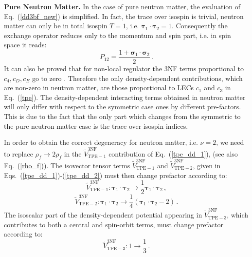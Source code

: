 {\bf Pure Neutron Matter.} In the case of pure neutron matter, the evaluation of Eq.~(\ref{dd3bf_new}) is simplified. In fact,
the trace over isospin is trivial, neutron matter can only be in total isospin $T=1$, i.e. $\boldsymbol\tau_1\cdot\boldsymbol\tau_2=1$. Consequently the exchange operator reduces only to the momentum and spin part, i.e. in spin space it reads:
\begin{equation}
P_{12}=\frac{1+\boldsymbol\sigma_1\cdot\boldsymbol\sigma_2}{2}\,.
\label{perm_op_2}
\end{equation}
It can also be proved that for non-local regulator the 3NF terms proportional to $c_4, c_D, c_E$ go to zero \cite{Tolos2008,Hebeler2010Jul}. Therefore the only density-dependent contributions, which are non-zero in neutron matter, are those proportional to LECs $c_1$ and $c_3$ in Eq.~(\ref{tpe}). The density-dependent interacting terms obtained in neutron matter will only differ with respect to the symmetric case ones by different pre-factors. This is due to the fact that the only part which changes from the symmetric to the pure neutron matter case is the trace over isospin indices. 

In order to obtain the correct degeneracy for neutron matter, i.e.  $\nu=2$, we need to replace $\rho_f \rightarrow 2\rho_f$ in the $\tilde V_\mathrm{TPE-1}^\mathrm{3NF}$ contribution of Eq.~(\ref{tpe_dd_1}), (see also Eq.~(\ref{rho_f})). The isovector tensor terms $\tilde V_\mathrm{TPE-1}^\mathrm{3NF}$ and  $\tilde V_\mathrm{TPE-2}^\mathrm{3NF}$, given in Eqs.~(\ref{tpe_dd_1})-(\ref{tpe_dd_2}) must then change prefactor according to:
\begin{equation}
\tilde V_\mathrm{TPE-1}^\mathrm{3NF}: \boldsymbol\tau_1\cdot\boldsymbol\tau_2 \rightarrow \frac{1}{2}\boldsymbol\tau_1\cdot\boldsymbol\tau_2\,, 
\label{pnm_tpe_1}
\end{equation}
\begin{equation}
\tilde V_\mathrm{TPE-2}^\mathrm{3NF}: \boldsymbol\tau_1\cdot\boldsymbol\tau_2 \rightarrow 
\frac{1}{4}(\boldsymbol\tau_1\cdot\boldsymbol\tau_2-2)\,.
\label{pnm_tpe_2}
\end{equation}
The isoscalar part of the density-dependent potential appearing in $\tilde V_\mathrm{TPE-3}^\mathrm{3NF}$, which contributes to both a central and spin-orbit terms, must change prefactor according to:
\begin{equation}
\tilde V_\mathrm{TPE-3}^\mathrm{3NF}: 1 \rightarrow \frac{1}{3}\,.
\label{pnm_tpe_3}
\end{equation}


